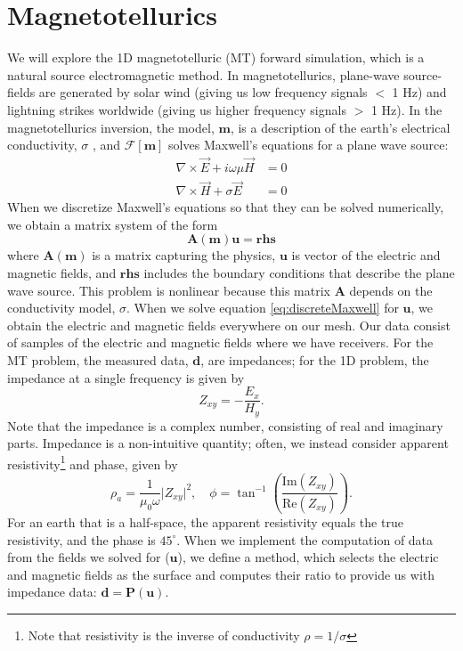 \documentclass[11pt,oneside]{article}
\begin{document}
\section{Magnetotellurics}
We will explore the 1D magnetotelluric (MT) forward simulation, which is a natural source electromagnetic method. In magnetotellurics, plane-wave source-fields are generated by solar wind (giving us low frequency signals $<$ 1 Hz) and lightning strikes worldwide (giving us higher frequency signals $>$ 1 Hz). In the magnetotellurics inversion, the model, $\mathbf{m}$, is a description of the earth’s electrical conductivity, $\sigma$ , and $\mathcal{F}[\mathbf{m}]$ solves Maxwell’s equations for a plane wave source:
\begin{equation}
\begin{split}
\nabla \times \vec{E} + i\omega\mu\vec{H} &= 0 \\
\nabla \times \vec{H} + \sigma\vec{E} &= 0
\end{split}
\label{eq:maxwell}
\end{equation}
When we discretize Maxwell's equations so that they can be solved numerically, we obtain a matrix system of the form
\begin{equation}
    \mathbf{A}(\mathbf{m})\mathbf{u} = \mathbf{rhs}
    \label{eq:discreteMaxwell}
\end{equation}
where $\mathbf{A}(\mathbf{m})$ is a matrix capturing the physics, $\mathbf{u}$ is vector of the electric and magnetic fields, and $\mathbf{rhs}$ includes the boundary conditions that describe the plane wave source. This problem is nonlinear because this matrix $\mathbf{A}$ depends on the conductivity model,  $\sigma$. When we solve equation \ref{eq:discreteMaxwell} for $\mathbf{u}$, we obtain the electric and magnetic fields everywhere on our mesh. Our data consist of samples of the electric and magnetic fields where we have receivers. For the MT problem, the measured data, $\mathbf{d}$, are impedances; for the 1D problem, the impedance at a single frequency is given by
\begin{equation}
Z_{xy} = -\frac{E_x}{H_y}.
\label{eq:impedance}
\end{equation}
Note that the impedance is a complex number, consisting of real and imaginary parts. Impedance is a non-intuitive quantity; often, we instead consider apparent resistivity\footnote{Note that resistivity is the inverse of conductivity $\rho = 1/\sigma$} and phase, given by
\begin{equation}
\rho_a = \frac{1}{\mu_0\omega} \big|Z_{xy}\big|^2,
\quad
\phi = \tan^{-1}\left(\frac{\text{Im}(Z_{xy})}{\text{Re}(Z_{xy})}\right).
\label{eq:rhoa_phase}
\end{equation}
For an earth that is a half-space, the apparent resistivity equals the true resistivity, and the phase is $45^{\circ}$. When we implement the computation of data from the fields we solved for ($\mathbf{u}$), we define a method, which selects the electric and magnetic fields as the surface and computes their ratio to provide us with impedance data: $\mathbf{d} = \mathbf{P}(\mathbf{u})$.
\end{document}
